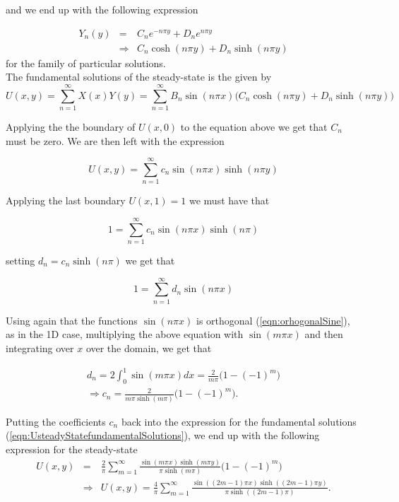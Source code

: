 \documentclass{article}
\begin{document}
and we end up with the following expression

\begin{eqnarray}
Y_n(y) &=& C_ne^{-n\pi y} + D_ne^{n\pi y} \\ 
&\Rightarrow & C_n\cosh(n\pi y) + D_n\sinh(n\pi y)
\end{eqnarray}
for the family of particular solutions.
\\

The fundamental solutions of the steady-state is the given by
\begin{equation}
U(x,y) = \sum_{n=1}^{\infty} X(x)Y(y) = \sum_{n=1}^{\infty} B_n\sin(n\pi x)\Big(C_n\cosh(n\pi y) + D_n\sinh(n\pi y)\Big)
\end{equation}

Applying the the boundary of $U(x,0)$ to the equation above we get that $C_n$ must be zero. We are then left with the expression

\begin{equation}
U(x,y) = \sum_{n=1}^{\infty} c_n \sin(n\pi x)\sinh(n\pi y)
\label{eqn:UsteadyStatefundamentalSolutions}
\end{equation}

Applying the last boundary $U(x,1) = 1$ we must have that

\begin{equation}
1 = \sum_{n=1}^{\infty} c_n \sin(n\pi x)\sinh(n\pi)
\end{equation}

setting $d_n = c_n\sinh(n\pi)$ we get that 

\begin{equation}
1 = \sum_{n=1}^{\infty} d_n \sin(n\pi x)
\end{equation}

Using again that the functions $\sin(n\pi x)$ is orthogonal (\ref{eqn:orhogonalSine}), as in the 1D case, multiplying the above equation with $ \sin(m\pi x)$ and  then integrating over $x$ over the domain, we get that 

\begin{subequations}
	\begin{eqnarray}
	d_n = 2\int_0^1 \sin(m\pi x) dx = \frac{2}{m\pi}\Big(1-(-1)^m\Big)\\
	\Rightarrow c_n = \frac{2}{m\pi \sinh(m\pi)}\Big(1-(-1)^m\Big).
	\end{eqnarray}
\end{subequations}

Putting the coefficients $c_n$ back into the expression for the fundamental solutions (\ref{eqn:UsteadyStatefundamentalSolutions}), we end up with the following expression for the steady-state
\begin{subequations}
	\begin{eqnarray}
	U(x,y) &=& \frac{2}{\pi} \sum_{m=1}^{\infty} \frac{\sin(m\pi x)\sinh(m\pi y)}{\pi \sinh(m\pi)}\Big(1-(-1)^m \Big)\\ 
	&\Rightarrow & U(x,y) = \frac{4}{\pi} \sum_{m=1}^{\infty} \frac{\sin((2m-1)\pi x)\sinh((2m-1)\pi y)}{\pi \sinh((2m-1)\pi)}.
	\end{eqnarray}
\end{subequations}
\end{document}
